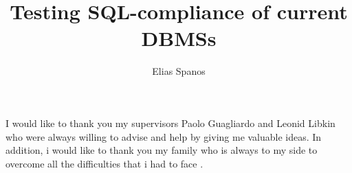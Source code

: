 \documentclass[msc, logo]{infthesis}  %
\title{ Testing SQL-compliance of current DBMSs}
\author{Elias Spanos}
\begin{document}
\begin{preliminary}

\maketitle

\begin{acknowledgements}
 
 
I would like to thank you my supervisors Paolo Guagliardo and Leonid Libkin who were always willing to advise and help by giving me valuable ideas. In addition, i would like to thank you my family who is always to my side to overcome all the difficulties that i had to face \cite {date1987guide}.  


\end{acknowledgements}

\standarddeclaration


\tableofcontents




\end{preliminary}



 





% 

\appendix





 




\end{document}
